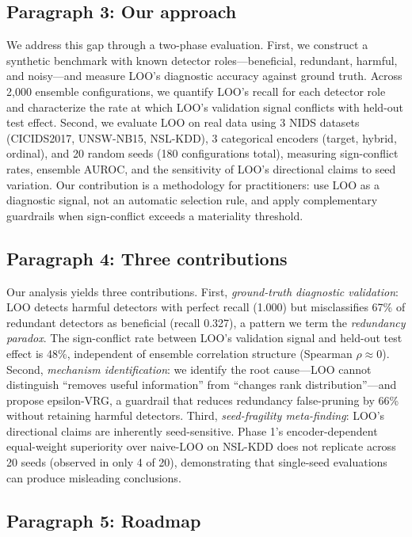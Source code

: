\subsection*{Paragraph 3: Our approach}

We address this gap through a two-phase evaluation. First, we construct a synthetic benchmark with known detector roles---beneficial, redundant, harmful, and noisy---and measure LOO's diagnostic accuracy against ground truth. Across 2,000 ensemble configurations, we quantify LOO's recall for each detector role and characterize the rate at which LOO's validation signal conflicts with held-out test effect. Second, we evaluate LOO on real data using 3 NIDS datasets (CICIDS2017, UNSW-NB15, NSL-KDD), 3 categorical encoders (target, hybrid, ordinal), and 20 random seeds (180 configurations total), measuring sign-conflict rates, ensemble AUROC, and the sensitivity of LOO's directional claims to seed variation. Our contribution is a methodology for practitioners: use LOO as a diagnostic signal, not an automatic selection rule, and apply complementary guardrails when sign-conflict exceeds a materiality threshold.

\subsection*{Paragraph 4: Three contributions}

Our analysis yields three contributions. First, \emph{ground-truth diagnostic validation}: LOO detects harmful detectors with perfect recall (1.000) but misclassifies 67\% of redundant detectors as beneficial (recall 0.327), a pattern we term the \emph{redundancy paradox}. The sign-conflict rate between LOO's validation signal and held-out test effect is 48\%, independent of ensemble correlation structure (Spearman $\rho \approx 0$). Second, \emph{mechanism identification}: we identify the root cause---LOO cannot distinguish ``removes useful information'' from ``changes rank distribution''---and propose epsilon-VRG, a guardrail that reduces redundancy false-pruning by 66\% without retaining harmful detectors. Third, \emph{seed-fragility meta-finding}: LOO's directional claims are inherently seed-sensitive. Phase 1's encoder-dependent equal-weight superiority over naive-LOO on NSL-KDD does not replicate across 20 seeds (observed in only 4 of 20), demonstrating that single-seed evaluations can produce misleading conclusions.

\subsection*{Paragraph 5: Roadmap}

